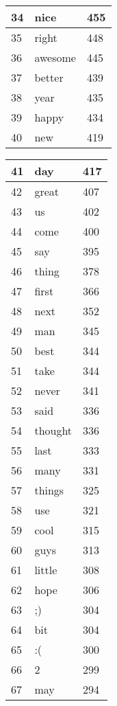 \begin{table}[!htbp]
\begin{minipage}[b]{.5\textwidth}
\begin{tabular}{|l|l|l|}
		34 & nice & 455 \\ \hline
		35 & right & 448 \\ \hline
		36 & awesome & 445 \\ \hline
		37 & better & 439 \\ \hline
		38 & year & 435 \\ \hline
		39 & happy & 434 \\ \hline
		40 & new & 419 \\ \hline
		\end{tabular}
\end{minipage}
\begin{minipage}[b]{.5\textwidth}
\centering
\begin{tabular}{|l|l|l|} %
		\hline
		41 & day & 417 \\ \hline
		42 & great & 407 \\ \hline
		43 & us & 402 \\ \hline
		44 & come & 400 \\ \hline
		45 & say & 395 \\ \hline
		46 & thing & 378 \\ \hline
		47 & first & 366 \\ \hline
		48 & next & 352 \\ \hline
		49 & man & 345 \\ \hline
		50 & best & 344 \\ \hline
		51 & take & 344 \\ \hline
		52 & never & 341 \\ \hline
		53 & said & 336 \\ \hline
		54 & thought & 336 \\ \hline
		55 & last & 333 \\ \hline
		56 & many & 331 \\ \hline
		57 & things & 325 \\ \hline
		58 & use & 321 \\ \hline
		59 & cool & 315 \\ \hline
		60 & guys & 313 \\ \hline
		61 & little & 308 \\ \hline
		62 & hope & 306 \\ \hline
		63 & ;) & 304 \\ \hline
		64 & bit & 304 \\ \hline
		65 & :( & 300 \\ \hline
		66 & 2 & 299 \\ \hline
		67 & may & 294 \\ \hline

\end{tabular}
\end{minipage}
\end{table}
